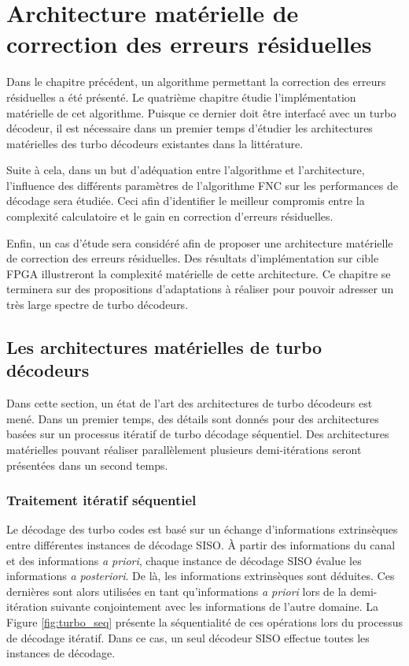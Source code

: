 \chapter{Architecture matérielle de correction des erreurs résiduelles}

Dans le chapitre précédent, un algorithme permettant la correction des erreurs résiduelles a été présenté. Le quatrième 
chapitre
étudie l'implémentation matérielle de cet algorithme. Puisque ce dernier doit être interfacé avec un
turbo décodeur, il est nécessaire dans un premier temps d'étudier les architectures matérielles des turbo décodeurs
existantes dans la littérature. 

Suite à cela, dans un but d'adéquation entre l'algorithme et l'architecture, l'influence des différents paramètres 
de l'algorithme FNC sur les performances de décodage sera étudiée. Ceci afin d'identifier le meilleur compromis entre la
complexité calculatoire et le gain en correction d'erreurs résiduelles.

Enfin, un cas d'étude sera considéré afin de proposer une architecture matérielle de correction des erreurs résiduelles.
Des résultats d’implémentation sur cible FPGA illustreront la complexité matérielle de cette architecture.
Ce chapitre se terminera sur des propositions d'adaptations à réaliser pour
pouvoir adresser un très large spectre de turbo décodeurs.

\vspace*{\fill}
\minitocTITI
\vspace*{\fill}
\newpage

\section{Les architectures matérielles de turbo décodeurs}
Dans cette section, un état de l'art des architectures de turbo décodeurs est mené. Dans un premier temps, des détails 
sont donnés pour des architectures basées sur un processus itératif de turbo décodage séquentiel. Des architectures 
matérielles pouvant réaliser parallèlement plusieurs demi-itérations seront présentées dans un second temps.

\subsection{Traitement itératif séquentiel}
Le décodage des turbo codes est basé sur un échange d'informations extrinsèques entre différentes instances de décodage SISO. À partir 
des informations du canal et des informations \textit{a priori}, chaque instance de décodage SISO évalue les informations 
\textit{a posteriori}. De là, les informations extrinsèques sont déduites. Ces dernières sont alors utilisées en tant
qu'informations \textit{a priori} lors de la demi-itération suivante conjointement avec les informations de l'autre
domaine. La Figure \ref{fig:turbo_seq} présente la séquentialité de ces opérations lors du processus de décodage
itératif. Dans ce cas, un seul décodeur SISO effectue toutes les instances de décodage.

